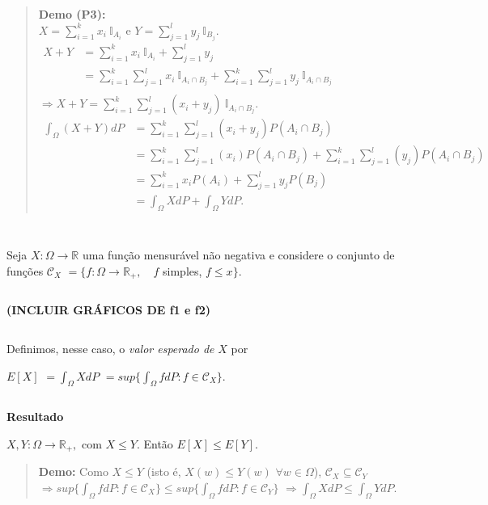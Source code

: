 \documentclass[
]{book}
\begin{document}
\begin{quote}
\textbf{Demo (P3):}\\
\(X = \sum_{i=1}^kx_i~\mathbb{I}_{A_i}\) e \(Y = \sum_{j=1}^ly_j~\mathbb{I}_{B_j}\).\\
\(\begin{array}{ll} X + Y & = \sum_{i=1}^k x_i ~\mathbb{I}_{A_i} + \sum_{j=1}^l y_j\\ & = \sum_{i=1}^k\sum_{j=1}^lx_i~\mathbb{I}_{A_i\cap B_j} + \sum_{i=1}^k\sum_{j=1}^ly_j~\mathbb{I}_{A_i\cap B_j}\\ \end{array}\)\\
\(\Longrightarrow X + Y = \sum_{i=1}^k\sum_{j=1}^l(x_i+y_j)~\mathbb{I}_{A_i\cap B_j}\).\\
\(\begin{array}{ll} \int_\Omega (X + Y) dP & = \sum_{i=1}^k\sum_{j=1}^l (x_i + y_j)P(A_i\cap B_j)\\ & = \sum_{i=1}^k\sum_{j=1}^l (x_i)P(A_i\cap B_j) + \sum_{i=1}^k\sum_{j=1}^l (y_j)P(A_i\cap B_j)\\ & = \sum_{i=1}^k x_i P(A_i) + \sum_{j=1}^l y_j P(B_j)\\ & = \int_\Omega X dP + \int_\Omega Y dP. \end{array}\)
\end{quote}

\(~\)

\(~\)

Seja \(X:\Omega\longrightarrow \mathbb{R}\) uma função mensurável não negativa e considere o conjunto de funções \(\mathcal{C}_X\) \(= \{ f:\Omega\longrightarrow \mathbb{R}_+,\quad f\) simples, \(f \leq x\}\).

\(~\)

\textbf{(INCLUIR GRÁFICOS DE f1 e f2)}

\(~\)

Definimos, nesse caso, o \emph{valor esperado de} \(X\) por

\(E[X]\) \(=\int_\Omega XdP\) \(=sup\{\int_\Omega fdP: f\in \mathcal{C}_X\}\).

\(~\)

\textbf{Resultado}

\(X,Y: \Omega \longrightarrow\mathbb{R}_+,\) com \(X\leq Y\). Então \(E[X] \leq E[Y]\).

\begin{quote}
\textbf{Demo:} Como \(X \leq Y\) (isto é, \(X(w) \leq Y(w)\) \(\forall w \in \Omega\)), \(\mathcal{C}_X \subseteq \mathcal{C}_Y\)\\
\(\Rightarrow sup\{\int_\Omega fdP: f\in \mathcal{C}_X\} \leq sup\{\int_\Omega fdP: f\in \mathcal{C}_Y\}\) \(\Rightarrow \int_\Omega XdP \leq \int_\Omega YdP\).
\end{quote}
\end{document}
